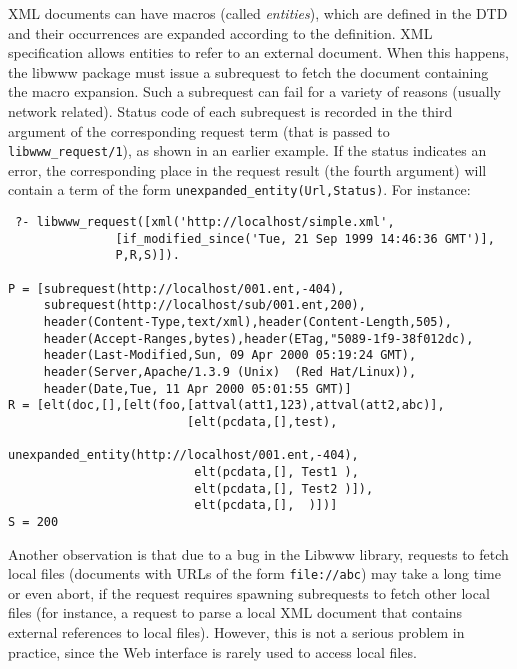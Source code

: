 XML documents can have macros (called \emph{entities}), which are defined
in the DTD and their occurrences are expanded according to the definition.
XML specification allows entities to refer to an external document.
When this happens, the libwww package must issue a subrequest to fetch the
document containing the macro expansion. Such a subrequest can fail for a
variety of reasons (usually network related).
Status code of each subrequest is recorded in the third argument of the
corresponding request term (that is passed to {\tt libwww\_request/1}), as
shown in an earlier example. If the status indicates an error, the
corresponding place in the request result (the fourth argument) will
contain a term of the form {\tt unexpanded\_entity(Url,Status)}. For instance:
\begin{verbatim}
 ?- libwww_request([xml('http://localhost/simple.xml',
		       [if_modified_since('Tue, 21 Sep 1999 14:46:36 GMT')],
		       P,R,S)]).

P = [subrequest(http://localhost/001.ent,-404),
     subrequest(http://localhost/sub/001.ent,200),
     header(Content-Type,text/xml),header(Content-Length,505),
     header(Accept-Ranges,bytes),header(ETag,"5089-1f9-38f012dc),
     header(Last-Modified,Sun, 09 Apr 2000 05:19:24 GMT),
     header(Server,Apache/1.3.9 (Unix)  (Red Hat/Linux)),
     header(Date,Tue, 11 Apr 2000 05:01:55 GMT)]
R = [elt(doc,[],[elt(foo,[attval(att1,123),attval(att2,abc)],
                         [elt(pcdata,[],test),
                          unexpanded_entity(http://localhost/001.ent,-404),
                          elt(pcdata,[], Test1 ),
                          elt(pcdata,[], Test2 )]),
                          elt(pcdata,[],  )])]
S = 200
\end{verbatim}

Another observation is that due to a bug in the Libwww library,
requests to fetch local files (documents with URLs of the form 
{\tt file://abc}) may take a long time or even abort, if the request requires
spawning subrequests to fetch other local files (for instance, a request to
parse a local XML document that contains external references to local
files). However, this is not a serious problem in practice, since the Web
interface is rarely used to access local files.



